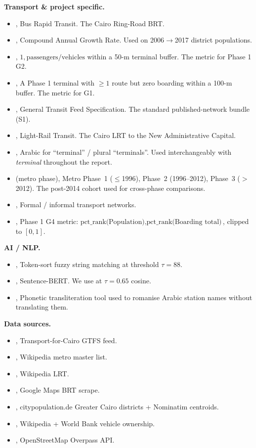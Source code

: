 \textbf{Transport \& project specific.}

\begin{itemize}
 \item {}, Bus Rapid Transit. The Cairo Ring-Road BRT.
 \item {}, Compound Annual Growth Rate. Used on 2006$\to$2017
 district populations.
 \item {}, $1, \text{passengers}/\text{vehicles}$
 within a 50-m terminal buffer. The metric for Phase 1 G2.
 \item {}, A Phase 1 terminal with $\geq 1$ route
 but zero boarding within a 100-m buffer. The metric for G1.
 \item {}, General Transit Feed Specification. The standard
 published-network bundle (S1).
 \item {}, Light-Rail Transit. The Cairo LRT to the New
 Administrative Capital.
 \item {}, Arabic for ``terminal'' / plural
 ``terminals''. Used interchangeably with \emph{terminal}
 throughout the report.
 \item {} (metro phase), Metro Phase~1 ($\le$1996),
 Phase~2 (1996--2012), Phase~3 ($>$2012). The post-2014 cohort
 used for cross-phase comparisons.
 \item {}, Formal / informal transport networks.
 \item {}, Phase 1 G4 metric:
 $\text{pct\_rank(Population)}, \text{pct\_rank(Boarding total)}$,
 clipped to $[0, 1]$.
\end{itemize}

\textbf{AI / NLP.}

\begin{itemize}
 \item {}, Token-sort fuzzy string matching at
 threshold $\tau = 88$.
 \item {}, Sentence-BERT. We use
 at $\tau = 0.65$ cosine.
 \item {}, Phonetic transliteration tool used to romanise
 Arabic station names without translating them.
\end{itemize}

\textbf{Data sources.}

\begin{itemize}
 \item {}, Transport-for-Cairo GTFS feed.
 \item {}, Wikipedia metro master list.
 \item {}, Wikipedia LRT.
 \item {}, Google Maps BRT scrape.
 \item {}, citypopulation.de Greater Cairo districts +
 Nominatim centroids.
 \item {}, Wikipedia + World Bank vehicle ownership.
 \item {}, OpenStreetMap Overpass API.
\end{itemize}
